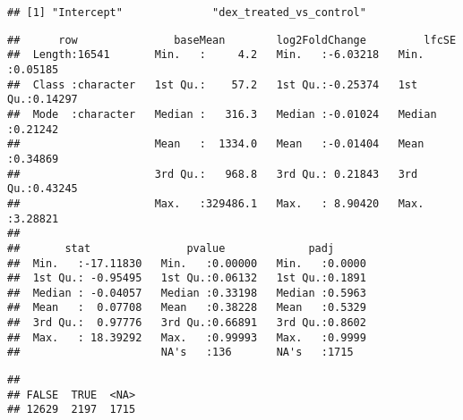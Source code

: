 \documentclass[]{article}
\newenvironment{Shaded}{\begin{snugshade}}{\end{snugshade}}
\newcommand{\KeywordTok}[1]{\textcolor[rgb]{0.13,0.29,0.53}{\textbf{#1}}}
\newcommand{\DataTypeTok}[1]{\textcolor[rgb]{0.13,0.29,0.53}{#1}}
\newcommand{\FloatTok}[1]{\textcolor[rgb]{0.00,0.00,0.81}{#1}}
\newcommand{\StringTok}[1]{\textcolor[rgb]{0.31,0.60,0.02}{#1}}
\newcommand{\CommentTok}[1]{\textcolor[rgb]{0.56,0.35,0.01}{\textit{#1}}}
\newcommand{\OperatorTok}[1]{\textcolor[rgb]{0.81,0.36,0.00}{\textbf{#1}}}
\newcommand{\NormalTok}[1]{#1}
\begin{document}
\begin{verbatim}
## [1] "Intercept"              "dex_treated_vs_control"
\end{verbatim}

\begin{Shaded}
\end{Shaded}

\begin{verbatim}
##      row               baseMean        log2FoldChange         lfcSE        
##  Length:16541       Min.   :     4.2   Min.   :-6.03218   Min.   :0.05185  
##  Class :character   1st Qu.:    57.2   1st Qu.:-0.25374   1st Qu.:0.14297  
##  Mode  :character   Median :   316.3   Median :-0.01024   Median :0.21242  
##                     Mean   :  1334.0   Mean   :-0.01404   Mean   :0.34869  
##                     3rd Qu.:   968.8   3rd Qu.: 0.21843   3rd Qu.:0.43245  
##                     Max.   :329486.1   Max.   : 8.90420   Max.   :3.28821  
##                                                                            
##       stat               pvalue             padj       
##  Min.   :-17.11830   Min.   :0.00000   Min.   :0.0000  
##  1st Qu.: -0.95495   1st Qu.:0.06132   1st Qu.:0.1891  
##  Median : -0.04057   Median :0.33198   Median :0.5963  
##  Mean   :  0.07708   Mean   :0.38228   Mean   :0.5329  
##  3rd Qu.:  0.97776   3rd Qu.:0.66891   3rd Qu.:0.8602  
##  Max.   : 18.39292   Max.   :0.99993   Max.   :0.9999  
##                      NA's   :136       NA's   :1715
\end{verbatim}

\begin{Shaded}
\end{Shaded}

\begin{verbatim}
## 
## FALSE  TRUE  <NA> 
## 12629  2197  1715
\end{verbatim}
\end{document}
